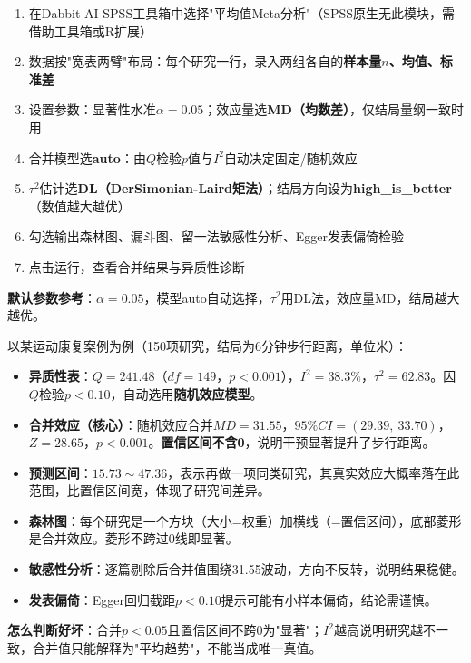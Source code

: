 \begin{algosposs}
\begin{enumerate}
    \item 在Dabbit AI SPSS工具箱中选择"平均值Meta分析"（SPSS原生无此模块，需借助工具箱或R扩展）
    \item 数据按"宽表两臂"布局：每个研究一行，录入两组各自的\textbf{样本量$n$、均值、标准差}
    \item 设置参数：显著性水准$\alpha=0.05$；效应量选\textbf{MD（均数差）}，仅结局量纲一致时用
    \item 合并模型选\textbf{auto}：由$Q$检验$p$值与$I^2$自动决定固定/随机效应
    \item $\tau^2$估计选\textbf{DL（DerSimonian-Laird矩法）}；结局方向设为\textbf{high\_is\_better}（数值越大越优）
    \item 勾选输出森林图、漏斗图、留一法敏感性分析、Egger发表偏倚检验
    \item 点击运行，查看合并结果与异质性诊断
\end{enumerate}

\textbf{默认参数参考}：$\alpha=0.05$，模型auto自动选择，$\tau^2$用DL法，效应量MD，结局越大越优。
\end{algosposs}

\begin{algoresult}
以某运动康复案例为例（150项研究，结局为6分钟步行距离，单位米）：

\begin{itemize}
    \item \textbf{异质性表}：$Q=241.48$（$df=149$，$p<0.001$），$I^2=38.3\%$，$\tau^2=62.83$。因$Q$检验$p<0.10$，自动选用\textbf{随机效应模型}。
    \item \textbf{合并效应（核心）}：随机效应合并$MD=31.55$，$95\%CI=(29.39,\ 33.70)$，$Z=28.65$，$p<0.001$。\textbf{置信区间不含0}，说明干预显著提升了步行距离。
    \item \textbf{预测区间}：$15.73\sim47.36$，表示再做一项同类研究，其真实效应大概率落在此范围，比置信区间宽，体现了研究间差异。
    \item \textbf{森林图}：每个研究是一个方块（大小=权重）加横线（=置信区间），底部菱形是合并效应。菱形不跨过0线即显著。
    \item \textbf{敏感性分析}：逐篇剔除后合并值围绕31.55波动，方向不反转，说明结果稳健。
    \item \textbf{发表偏倚}：Egger回归截距$p<0.10$提示可能有小样本偏倚，结论需谨慎。
\end{itemize}

\textbf{怎么判断好坏}：合并$p<0.05$且置信区间不跨0为"显著"；$I^2$越高说明研究越不一致，合并值只能解释为"平均趋势"，不能当成唯一真值。
\end{algoresult}

